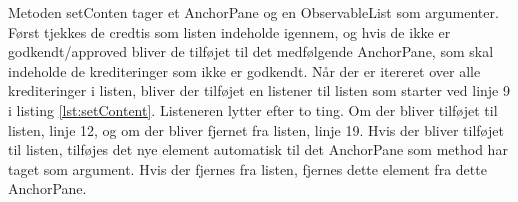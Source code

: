Metoden setConten tager et AnchorPane og en ObservableList som argumenter. Først tjekkes de credtis som listen indeholde igennem, og hvis de ikke er godkendt/approved bliver de tilføjet til det medfølgende AnchorPane, som skal indeholde de krediteringer som ikke er godkendt. Når der er itereret over alle krediteringer i listen, bliver der tilføjet en listener til listen som starter ved linje 9 i listing \ref{lst:setContent}. Listeneren lytter efter to ting. Om der bliver tilføjet til listen, linje 12, og om der bliver fjernet fra listen, linje 19. Hvis der bliver tilføjet til listen, tilføjes det nye element automatisk til det AnchorPane som method har taget som argument. Hvis der fjernes fra listen, fjernes dette element fra dette AnchorPane.




